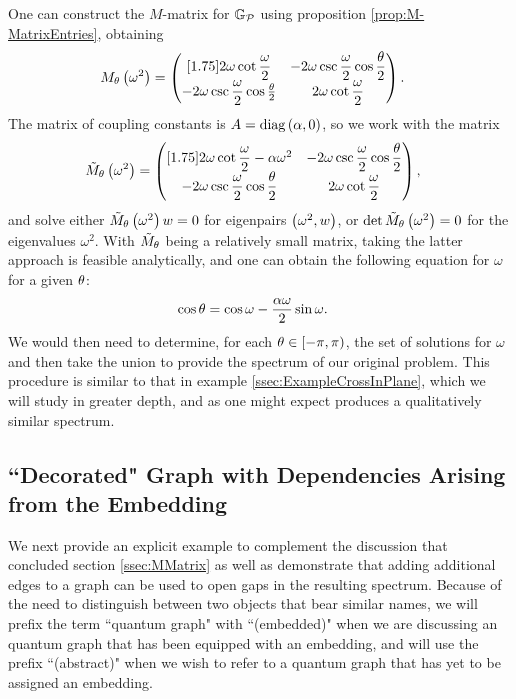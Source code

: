 One can construct the $M$-matrix for $\mathbb{G}_{\mathcal{P}}$ using proposition \ref{prop:M-MatrixEntries}, obtaining
\begin{align*}
	M_{\theta}\left( \omega^2 \right) &= 
	\begin{pmatrix}[1.75]
		2\omega\cot\dfrac{\omega}{2} & -2\omega\csc\dfrac{\omega}{2}\cos\dfrac{\theta}{2} \\
		-2\omega\csc\dfrac{\omega}{2}\cos\frac{\theta}{2} & 2\omega\cot\dfrac{\omega}{2}
	\end{pmatrix}.
\end{align*}
The matrix of coupling constants is $A = \mathrm{diag}\left( \alpha, 0 \right)$, so we work with the matrix
\begin{align*}
	\tilde{M}_\theta\left( \omega^2 \right) &= 
	\begin{pmatrix}[1.75]
		2\omega\cot\dfrac{\omega}{2} - \alpha\omega^2 & -2\omega\csc\dfrac{\omega}{2}\cos\dfrac{\theta}{2} \\
		-2\omega\csc\dfrac{\omega}{2}\cos\dfrac{\theta}{2} & 2\omega\cot\dfrac{\omega}{2}		
	\end{pmatrix},
\end{align*}
and solve either $\tilde{M}_\theta\left( \omega^2 \right) w = 0$ for eigenpairs $\left( \omega^2, w \right)$, or $\det\tilde{M}_\theta \left( \omega^2 \right) = 0$ for the eigenvalues $\omega^2$.
With $\tilde{M}_\theta$ being a relatively small matrix, taking the latter approach is feasible analytically, and one can obtain the following equation for $\omega$ for a given $\theta$:
\begin{align*}
	\cos\theta &= \cos\omega - \frac{\alpha\omega}{2}\sin\omega.
\end{align*}
We would then need to determine, for each $\theta\in\left[-\pi, \pi\right)$, the set of solutions for $\omega$ and then take the union to provide the spectrum of our original problem.
This procedure is similar to that in example \ref{ssec:ExampleCrossInPlane}, which we will study in greater depth, and as one might expect produces a qualitatively similar spectrum.

\subsection{``Decorated" Graph with Dependencies Arising from the Embedding} \label{ssec:EmbeddingDependentExample}
We next provide an explicit example to complement the discussion that concluded section \ref{ssec:MMatrix} as well as demonstrate that adding additional edges to a graph can be used to open gaps in the resulting spectrum.
Because of the need to distinguish between two objects that bear similar names, we will prefix the term ``quantum graph" with ``(embedded)" when we are discussing an quantum graph that has been equipped with an embedding, and will use the prefix ``(abstract)" when we wish to refer to a quantum graph that has yet to be assigned an embedding.

